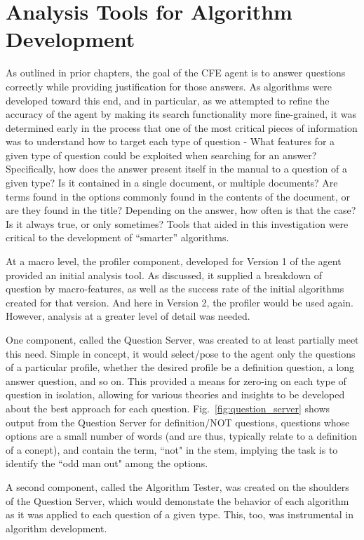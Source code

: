 \section{Analysis Tools for Algorithm Development}

As outlined in prior chapters, the goal of the CFE agent is to answer questions correctly while providing justification for those answers.  As algorithms were developed toward this end, and in particular, as we attempted to refine the accuracy of the agent by making its search functionality more fine-grained, it was determined early in the process that one of the most critical pieces of information was to understand how to target each type of question - What features for a given type of question could be exploited when searching for an answer?  Specifically, how does the answer present itself in the manual to a question of a given type?  Is it contained in a single document, or multiple documents?  Are terms found in the options commonly found in the contents of the document, or are they found in the title?  Depending on the answer, how often is that the case?  Is it always true, or only sometimes?  Tools that aided in this investigation were critical to the development of ``smarter'' algorithms.  

At a macro level, the profiler component, developed for Version 1 of the agent provided an initial analysis tool.  As discussed, it supplied a breakdown of question by macro-features, as well as the success rate of the initial algorithms created for that version.  And here in Version 2, the profiler would be used again.  However, analysis at a greater level of detail was needed.

One component, called the Question Server, was created to at least partially meet this need.  Simple in concept, it would select/pose to the agent only the questions of a particular profile, whether the desired profile be a definition question, a long answer question, and so on.  This provided a means for zero-ing on each type of question in isolation, allowing for various theories and insights to be developed about the best approach for each question.  Fig.~\ref{fig:question_server} shows output from the Question Server for definition/NOT questions, questions whose options are a small number of words (and are thus, typically relate to a definition of a conept), and contain the term, ``not" in the stem, implying the task is to identify the ``odd man out" among the options.

A second component, called the Algorithm Tester, was created on the shoulders of the Question Server, which would demonstate the behavior of each algorithm as it was applied to each question of a given type.  This, too, was instrumental in algorithm development.

